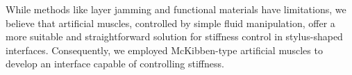 While methods like layer jamming and functional materials have limitations, we believe that artificial muscles, controlled by simple fluid manipulation, offer a more suitable and straightforward solution for stiffness control in stylus-shaped interfaces.
Consequently, we employed McKibben-type artificial muscles to develop an interface capable of controlling stiffness.
